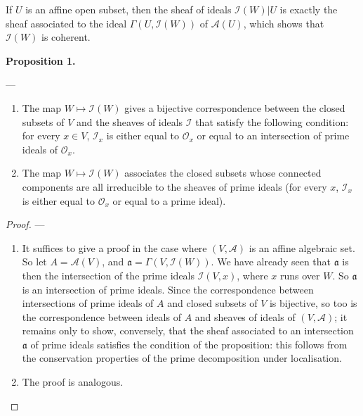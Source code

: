 \documentclass[british]{article}
\providecommand{\tightlist}{%
\setlength{\itemsep}{0pt}\setlength{\parskip}{0pt}}
\newenvironment{itenv}[1]
  {\phantomsection\par\smallskip\noindent\textbf{#1.}\itshape}
  {\par\smallskip}
\begin{document}
If \(U\) is an affine open subset, then the sheaf of ideals
\({\mathscr{I}}(W)|U\) is exactly the sheaf associated to the ideal
\(\Gamma(U,{\mathscr{I}}(W))\) of \({\mathscr{A}}(U)\), which shows that
\({\mathscr{I}}(W)\) is coherent.

\protect{}\label{proposition-1}
\begin{itenv}{Proposition 1}

---

\begin{enumerate}
\def\labelenumi{\alph{enumi}.}
\tightlist
\item
  The map \(W\mapsto{\mathscr{I}}(W)\) gives a bijective correspondence
  between the closed subsets of \(V\) and the sheaves of ideals
  \({\mathscr{I}}\) that satisfy the following condition: for every
  \(x\in V\), \({\mathscr{I}}_x\) is either equal to \({\mathscr{O}}_x\)
  or equal to an intersection of prime ideals of \({\mathscr{O}}_x\).
\item
  The map \(W\mapsto{\mathscr{I}}(W)\) associates the closed subsets
  whose connected components are all irreducible to the sheaves of prime
  ideals (for every \(x\), \({\mathscr{I}}_x\) is either equal to
  \({\mathscr{O}}_x\) or equal to a prime ideal).
\end{enumerate}

\end{itenv}

\begin{proof}
---

\begin{enumerate}
\def\labelenumi{\alph{enumi}.}
\tightlist
\item
  It suffices to give a proof in the case where \((V,{\mathscr{A}})\) is
  an affine algebraic set. So let \(A={\mathscr{A}}(V)\), and
  \(\mathfrak{a}=\Gamma(V,{\mathscr{I}}(W))\). We have already seen that
  \(\mathfrak{a}\) is then the intersection of the prime ideals
  \({\mathscr{I}}(V,x)\), where \(x\) runs over \(W\). So
  \(\mathfrak{a}\) is an intersection of prime ideals. Since the
  correspondence between intersections of prime ideals of \(A\) and
  closed subsets of \(V\) is bijective, so too is the correspondence
  between ideals of \(A\) and sheaves of ideals of
  \((V,{\mathscr{A}})\); it remains only to show, conversely, that the
  sheaf associated to an intersection \(\mathfrak{a}\) of prime ideals
  satisfies the condition of the proposition: this follows from the
  conservation properties of the prime decomposition under localisation.
\item
  The proof is analogous.
\end{enumerate}

\end{proof}
\end{document}
